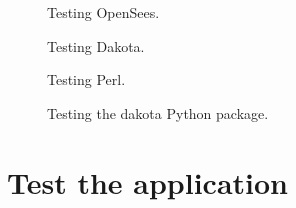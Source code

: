 \begin{figure}[!htbp]
  \caption{Testing OpenSees.}
  \label{fig:opensees_test}
\end{figure}

\begin{figure}[!htbp]
  \caption{Testing Dakota.}
  \label{fig:dakota_test}
\end{figure}

\begin{figure}[!htbp]
  \caption{Testing Perl.}
  \label{fig:perl_test}
\end{figure}

\begin{figure}[!htbp]
  \caption{Testing the dakota Python package.}
  \label{fig:dakota_py_test}
\end{figure}

\section{Test the \texttt{\getsoftwarename{}} application}
\label{sec:test_local}

